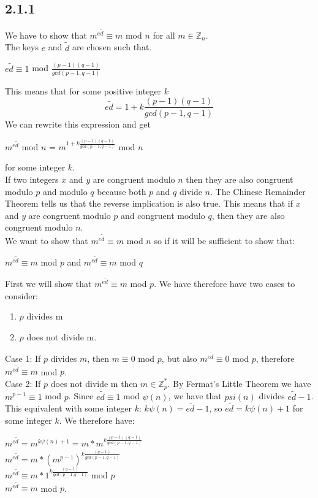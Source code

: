 \documentclass[11pt]{report}
\begin{document}
\subsection*{2.1.1}
We have to show that $m^{e\tilde{d}} \equiv m$ mod $n$ for all $m \in \mathbb{Z}_{n}$.\\
The keys $e$ and $\tilde{d}$ are chosen such that.
\begin{center}
$e\tilde{d} \equiv 1$ mod $\frac{(p-1)(q-1)}{gcd(p-1,q-1)}$
\end{center}
This means that for some positive integer $k$
$$e\tilde{d} = 1 + k\frac{(p-1)(q-1)}{gcd(p-1,q-1)}$$
We can rewrite this expression and get
\begin{center}
$m^{e\tilde{d}}$ mod $n$ = $m^{1+k\frac{(p-1)(q-1)}{gcd(p-1,q-1)}}$ mod $n$
\end{center}
for some integer $k$.\\
If two integers $x$ and $y$ are congruent modulo $n$ then they are also congruent modulo $p$ and modulo $q$ because both $p$ and $q$ divide $n$. The Chinese Remainder Theorem tells us that the reverse implication is also true. This means that if $x$ and $y$ are congruent modulo $p$ and congruent modulo $q$, then they are also congruent modulo $n$.\\
We want to show that $m^{e\tilde{d}} \equiv m$ mod $n$ so if it will be sufficient to show that:
\begin{center}
$m^{e\tilde{d}} \equiv m$ mod $p$ and  $m^{e\tilde{d}} \equiv m$ mod $q$
\end{center}
First we will show that $m^{e\tilde{d}} \equiv m$ mod $p$. We have therefore have two cases to consider:
\begin{enumerate}
\item $p$ divides m
\item $p$ does not divide m.
\end{enumerate}
Case 1: If $p$ divides $m$, then $m \equiv 0$ mod $p$, but also $m^{e\tilde{d}} \equiv 0$ mod $p$, therefore $m^{e\tilde{d}} \equiv m$ mod $p$.\\
Case 2: If $p$ does not divide m then $m \in \mathbb{Z}^*_p$. By Fermat's Little Theorem we have $m^{p-1} \equiv 1$ mod $p$. Since $e\tilde{d} \equiv 1$ mod $\psi(n)$, we have that $psi(n)$ divides $e\tilde{d} - 1$. This equivalent with some integer $k$: $k \psi(n) = e\tilde{d} - 1$, so $e\tilde{d} = k \psi(n) + 1$ for some integer $k$. We therefore have:
\begin{center}
$m^{e\tilde{d}} = m^{k\psi(n)+1} = m * m^{k\frac{(p-1)(q-1)}{gcd(p-1,q-1)}}$ \\
$m^{e\tilde{d}} = m * (m^{p-1})^{k\frac{(q-1)}{gcd(p-1,q-1)}}$ \\
$m^{e\tilde{d}} \equiv m * 1^{k\frac{(q-1)}{gcd(p-1,q-1)}}$ mod $p$ \\
$m^{e\tilde{d}} \equiv m$ mod $p$.
\end{center}
\end{document}
